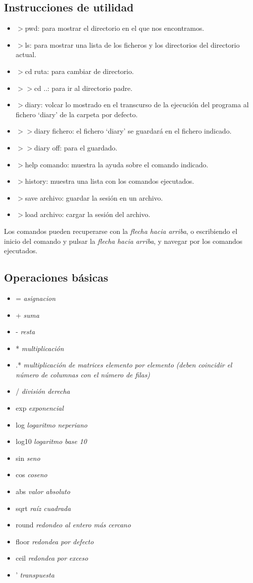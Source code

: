 \documentclass[a4,12pt,graphicx,caption,rotating]{article}
\begin{document}
\subsection{Instrucciones de utilidad}
\begin{itemize}
\item$>$pwd: para mostrar el directorio en el que nos encontramos.
\item$>$ls: para mostrar una lista de los ficheros y los directorios del directorio actual.
\item$>$cd ruta: para cambiar de directorio.
\item$>>$cd ..: para ir al directorio padre.
\item$>$diary: volcar lo mostrado en el transcurso de la ejecución del programa al fichero ‘diary’ de la carpeta por defecto.
\item$>>$diary fichero: el fichero ‘diary’ se guardará en el fichero indicado.
\item$>>$diary off: para el guardado.
\item$>$help comando: muestra la ayuda sobre el comando indicado.
\item$>$history: muestra una lista con los comandos ejecutados.
\item$>$save archivo: guardar la sesión en un archivo.
\item$>$load archivo: cargar la sesión del archivo.
\end{itemize}
Los comandos pueden recuperarse con la \emph{flecha hacia arriba}, o escribiendo el inicio del comando y pulsar la \emph{flecha hacia arriba}, y navegar por los comandos ejecutados.
\subsection{Operaciones básicas}
\begin{itemize}
\item= \emph{asignacion}
\item+ \emph{suma}
\item- \emph{resta}
\item* \emph{multiplicación}
\item.* \emph{multiplicación de matrices elemento por elemento (deben coincidir el número de columnas con el número de filas)}
\item/ \emph{división derecha}
\item exp \emph{exponencial}
\item log \emph{logaritmo neperiano}
\item log10 \emph{logaritmo base 10}
\item sin \emph{seno}
\item cos \emph{coseno}
\item abs \emph{valor absoluto}
\item sqrt \emph{raíz cuadrada}
\item round \emph{redondeo al entero más cercano}
\item floor \emph{redondea por defecto}
\item ceil \emph{redondea por exceso}
\item ' \emph{transpuesta}
\end{itemize}
\end{document}
